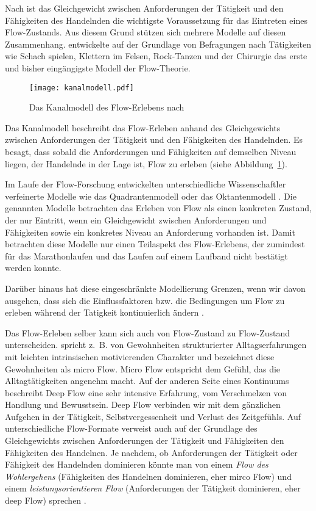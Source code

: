 Nach \citet[]{Csikszentmihalyi2010} ist das Gleichgewicht zwischen Anforderungen der Tätigkeit und den Fähigkeiten des Handelnden die wichtigste Voraussetzung für das Eintreten eines Flow-Zustands. Aus diesem Grund stützen sich mehrere Modelle auf diesen Zusammenhang. \citet[S.~75]{Csikszentmihalyi2010} entwickelte auf der Grundlage von Befragungen nach Tätigkeiten wie Schach spielen, Klettern im Felsen, Rock-Tanzen und der Chirurgie das erste und bisher eingängigste Modell der Flow-Theorie. 
\begin{figure}
	[!htb] \centering 
	\texttt{[image: kanalmodell.pdf]} \caption[Das Kanalmodell des Flow-Erlebens]{Das Kanalmodell des Flow-Erlebens nach \citet[S.~75]{Csikszentmihalyi2010}} \label{fig:kanalmodell} 
\end{figure}

Das Kanalmodell beschreibt das Flow-Erleben anhand des Gleichgewichts zwischen Anforderungen der Tätigkeit und den Fähigkeiten des Handelnden. Es besagt, dass sobald die Anforderungen und Fähigkeiten auf demselben Niveau liegen, der Handelnde in der Lage ist, Flow zu erleben (siehe Abbildung~\ref{fig:kanalmodell}). 

Im Laufe der Flow-Forschung entwickelten unterschiedliche Wissenschaftler verfeinerte Modelle wie das Quadrantenmodell \citep[S.~286]{Csikszentmihalyi1995} oder das Oktantenmodell \citep[S.~296]{Massimini1995}. Die genannten Modelle betrachten das Erleben von Flow als einen konkreten Zustand, der nur Eintritt, wenn ein Gleichgewicht zwischen Anforderungen und Fähigkeiten sowie ein konkretes Niveau an Anforderung vorhanden ist. Damit betrachten diese Modelle nur einen Teilaspekt des Flow-Erlebens, der zumindest für das Marathonlaufen \citep{Stoll2005} und das Laufen auf einem Laufband \citep{Reinhardt2006} nicht bestätigt werden konnte. 

Darüber hinaus hat diese eingeschränkte Modellierung Grenzen, wenn wir davon ausgehen, dass sich die Einflussfaktoren bzw. die Bedingungen um Flow zu erleben während der Tatigkeit kontinuierlich ändern \citep{Grueter2016b}.

Das Flow-Erleben selber kann sich auch von Flow-Zustand zu Flow-Zustand unterscheiden. \citet[][S.~222]{Csikszentmihalyi2010} spricht z.~B. von Gewohnheiten strukturierter Alltagserfahrungen mit leichten intrinsischen motivierenden Charakter und bezeichnet diese Gewohnheiten als micro Flow. Micro Flow entspricht dem Gefühl, das die Alltagtätigkeiten angenehm macht. Auf der anderen Seite eines Kontinuums beschreibt Deep Flow eine sehr intensive Erfahrung, vom Verschmelzen von Handlung und Bewusstsein. Deep Flow verbinden wir mit dem gänzlichen Aufgehen in der Tätigkeit, Selbstvergessenheit und Verlust des Zeitgefühls. Auf unterschiedliche Flow-Formate verweist auch \citet{Moneta2012} auf der Grundlage des Gleichgewichts zwischen Anforderungen der Tätigkeit und Fähigkeiten den Fähigkeiten des Handelnen. Je nachdem, ob Anforderungen der Tätigkeit oder Fähigkeit des Handelnden dominieren könnte man von einem \emph{Flow des Wohlergehens} (Fähigkeiten des Handelnen dominieren, eher mirco Flow) und einem \emph{leistungsorientieren Flow} (Anforderungen der Tätigkeit dominieren, eher deep Flow) sprechen \citep{Grueter2016b}.

